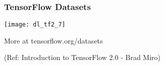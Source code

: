 

\begin{frame}[fragile] \frametitle{TensorFlow Datasets}

\begin{center}
\texttt{[image: dl\_tf2\_7]}
\end{center}

More at tensorflow.org/datasets

\tiny{(Ref: Introduction to TensorFlow 2.0 - Brad Miro)}
\end{frame}











